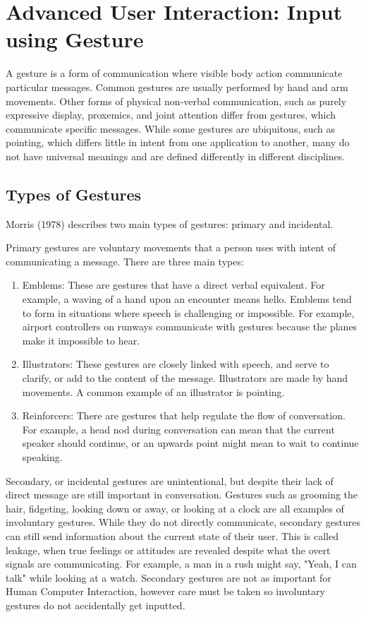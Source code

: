 \documentclass[11pt]{report}
\begin{document}
\section{Advanced User Interaction: Input using Gesture}

A gesture is a form of communication where visible body action communicate particular messages.
Common gestures are usually performed by hand and arm movements.
Other forms of physical non-verbal communication, such as purely expressive display, proxemics, and joint attention differ from gestures, which communicate specific messages.
While some gestures are ubiquitous, such as pointing, which differs little in intent from one application to another, many do not have universal meanings and are defined differently in different disciplines.

\subsection{Types of Gestures}

Morris (1978) describes two main types of gestures: primary and incidental.

Primary gestures are voluntary movements that a person uses with intent of communicating a message. There are three main types:

\begin{enumerate}
\item Emblems: These are gestures that have a direct verbal equivalent. 
For example, a waving of a hand upon an encounter means hello. 
Emblems tend to form in situations where speech is challenging or impossible.
For example, airport controllers on runways communicate with gestures because the planes make it impossible to hear.

\item Illustrators: These gestures are closely linked with speech, and serve to clarify, or add to the content of the message. 
Illustrators are made by hand movements.
A common example of an illustrator is pointing.

\item Reinforcers: There are gestures that help regulate the flow of conversation.
For example, a head nod during conversation can mean that the current speaker should continue, or an upwards point might mean to wait to continue speaking.
\end{enumerate}

Secondary, or incidental gestures are unintentional, but despite their lack of direct message are still important in conversation.
Gestures such as grooming the hair, fidgeting, looking down or away, or looking at a clock are all examples of involuntary gestures.
While they do not directly communicate, secondary gestures can still send information about the current state of their user.
This is called leakage, when true feelings or attitudes are revealed despite what the overt signals are communicating.
For example, a man in a rush might say, "Yeah, I can talk" while looking at a watch.
Secondary gestures are not as important for Human Computer Interaction, however care must be taken so involuntary gestures do not accidentally get inputted. 
\end{document}
